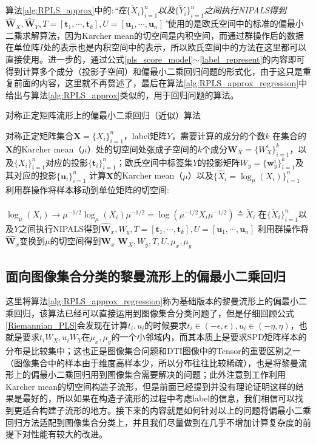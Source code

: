 算法\ref{alg:RPLS_approx}中的:\textit{“在$\{\tilde{X}_{i}\}_{i=1}^{n}$以及$\{\tilde{Y}_{i}\}_{i=1}^{n}$之间执行NIPALS\cite{pls_NIPALS}得到$\hat{\bm{W}}_X,\hat{\bm{W}}_Y,T=[\bm{t}_1,\cdots,\bm{t}_k],U=[\bm{u}_1,\cdots,\bm{u}_n]$”}使用的是欧氏空间中的标准的偏最小二乘求解算法，因为Karcher mean的切空间是内积空间，而通过群操作后的数据在单位阵$I$处的表示也是内积空间中的表示，所以欧氏空间中的方法在这里都可以直接使用。进一步的，通过公式\ref{pls_score_model}$\sim$\ref{label_represent}的内容即可得到计算多个成分（投影子空间）和偏最小二乘回归问题的形式化，由于这只是重复前面的内容，这里就不再赘述了，最后在算法\ref{alg:RPLS_approx_regression}中给出与算法\ref{alg:RPLS_approx}类似的，用于回归问题的算法。
\begin{algorithm}[hbt]
\caption{对称正定矩阵流形上的偏最小二乘回归（近似）算法}
\label{alg:RPLS_approx_regression}
\begin{algorithmic}[1]
\REQUIRE 对称正定矩阵集合$\bm{X}=\{X_i\}_{i=1}^{n}$，label矩阵$Y$，需要计算的成分的个数$k$
\ENSURE 在集合的$\bm{X}$的Karcher mean（$\mu$）处的切空间处张成子空间的$k$个成分$\bm{W}_{X}=\{W_{X}^{i}\}_{i=1}^{k}$，以及$\{X_i\}_{i=1}^{n}$对应的投影$\{\bm{t}_i\}_{i=1}^{n}$；欧氏空间中标签集$Y$的投影矩阵$W_y=\{\bm{w}_{y}^{i}\}_{i=1}^{k}$及其对应的投影$\{\bm{u}_i\}_{i=1}^{n}$
\STATE 计算$\bm{X}$的Karcher mean（$\mu$）以及$\{\hat{X}_i=\log_{\mu}(X_i)\}_{i=1}^{n}$
\STATE 利用群操作将样本移动到单位矩阵的切空间:\\
 ~~~~~~~~~~~~~~~~~~~~$\log_{\mu}(X_i)\rightarrow \mu^{-1/2}\log_{\mu}(X_i)\mu^{-1/2}=\log(\mu^{-1/2}X_i\mu^{-1/2})\triangleq \tilde{X}_i$
\STATE 在$\{\tilde{X}_{i}\}_{i=1}^{n}$以及$Y$之间执行NIPALS\cite{pls_NIPALS}得到$\hat{\bm{W}}_x,W_y,T=[\bm{t}_1,\cdots,\bm{t}_k],U=[\bm{u}_1,\cdots,\bm{u}_n]$
\STATE 利用群操作将$\hat{\bm{W}}_x$变换到$\mu$的切空间得到$\bm{W}_x$
\RETURN $\bm{W}_X,W_y,T,U,\mu_x,\mu_y$
\end{algorithmic}
\end{algorithm}
\subsection{面向图像集合分类的黎曼流形上的偏最小二乘回归}
\label{sec:ImageSet_PLS}
这里将算法\ref{alg:RPLS_approx_regression}称为基础版本的黎曼流形上的偏最小二乘回归，该算法已经可以直接运用到图像集合分类问题了，但是仔细回顾公式\ref{Riemannian_PLS}会发现在计算$t_i,u_i$的时候要求$t_i \in (-\epsilon,\epsilon),u_i \in (-\eta,\eta)$，也就是要求$t_iW_X,u_iW_Y$在$\mu_x,\mu_y$的一个小邻域内，而其本质上是要求SPD矩阵样本的分布是比较集中；这也正是图像集合问题和DTI图像中的Tensor的重要区别之一（图像集合中的样本由于维度高样本少，所以分布往往比较稀疏），也是将黎曼流形上的偏最小二乘回归用到图像集合需要解决的问题；此外注意到工作\cite{RCCA,PGA}利用Karcher mean的切空间构造子流形，但是前面已经提到并没有理论证明这样的结果是最好的，所以如果在构造子流形的过程中考虑label的信息，我们相信可以找到更适合构建子流形的地方。接下来的内容就是如何针对以上的问题将偏最小二乘回归方法适配到图像集合分类上，并且我们尽量做到在几乎不增加计算复杂度的前提下对性能有较大的改进。
